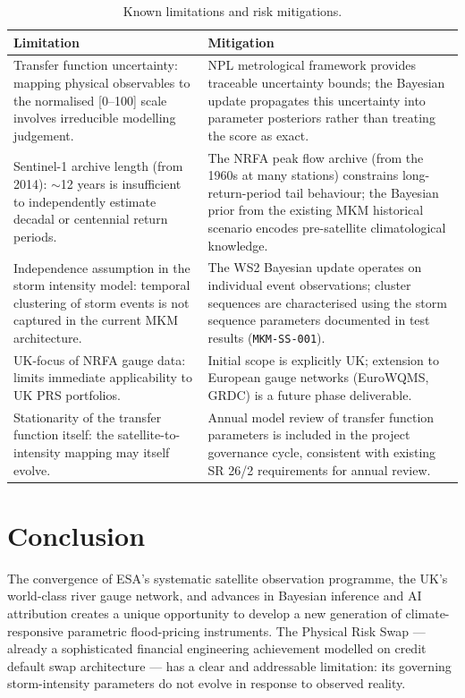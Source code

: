 \documentclass[11pt,a4paper]{article}
\begin{document}
\begin{table}[H]
\centering
\caption{Known limitations and risk mitigations.}
\begin{tabular}{p{6.2cm} p{6.2cm}}
\toprule
\textbf{Limitation} & \textbf{Mitigation} \\
\midrule
Transfer function uncertainty: mapping physical observables to the normalised
[0--100] scale involves irreducible modelling judgement. &
NPL metrological framework provides traceable uncertainty bounds; the Bayesian
update propagates this uncertainty into parameter posteriors rather than treating
the score as exact. \\
\addlinespace
Sentinel-1 archive length (from 2014): $\sim$12 years is insufficient to
independently estimate decadal or centennial return periods. &
The NRFA peak flow archive (from the 1960s at many stations) constrains
long-return-period tail behaviour; the Bayesian prior from the existing MKM
historical scenario encodes pre-satellite climatological knowledge. \\
\addlinespace
Independence assumption in the storm intensity model: temporal clustering of storm
events is not captured in the current MKM architecture. &
The WS2 Bayesian update operates on individual event observations; cluster
sequences are characterised using the storm sequence parameters documented in test
results (\texttt{MKM-SS-001}). \\
\addlinespace
UK-focus of NRFA gauge data: limits immediate applicability to UK PRS portfolios. &
Initial scope is explicitly UK; extension to European gauge networks (EuroWQMS,
GRDC) is a future phase deliverable. \\
\addlinespace
Stationarity of the transfer function itself: the satellite-to-intensity mapping
may itself evolve. &
Annual model review of transfer function parameters is included in the project
governance cycle, consistent with existing SR 26/2 requirements for annual review. \\
\bottomrule
\end{tabular}
\end{table}

\section{Conclusion}

The convergence of ESA's systematic satellite observation programme, the UK's
world-class river gauge network, and advances in Bayesian inference and AI
attribution creates a unique opportunity to develop a new generation of
climate-responsive parametric flood-pricing instruments. The Physical Risk Swap ---
already a sophisticated financial engineering achievement modelled on credit
default swap architecture --- has a clear and addressable limitation: its governing
storm-intensity parameters do not evolve in response to observed reality.
\end{document}
